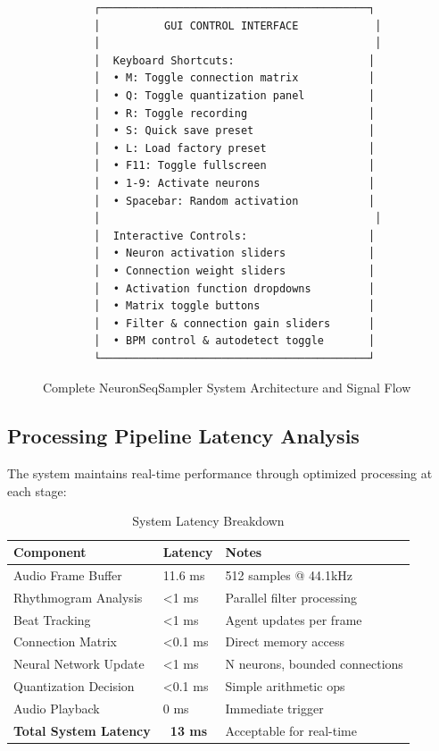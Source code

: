 \documentclass[11pt,a4paper]{article}
\begin{document}
\begin{figure}[h]
\begin{verbatim}
        ┌──────────────────────────────────────────┐
        │          GUI CONTROL INTERFACE            │
        │                                           │
        │  Keyboard Shortcuts:                     │
        │  • M: Toggle connection matrix           │
        │  • Q: Toggle quantization panel          │
        │  • R: Toggle recording                   │
        │  • S: Quick save preset                  │
        │  • L: Load factory preset                │
        │  • F11: Toggle fullscreen                │
        │  • 1-9: Activate neurons                 │
        │  • Spacebar: Random activation           │
        │                                           │
        │  Interactive Controls:                   │
        │  • Neuron activation sliders             │
        │  • Connection weight sliders             │
        │  • Activation function dropdowns         │
        │  • Matrix toggle buttons                 │
        │  • Filter & connection gain sliders      │
        │  • BPM control & autodetect toggle       │
        └──────────────────────────────────────────┘
\end{verbatim}
\caption{Complete NeuronSeqSampler System Architecture and Signal Flow}
\label{fig:system_architecture}
\end{figure}

\subsection{Processing Pipeline Latency Analysis}

The system maintains real-time performance through optimized processing at each stage:

\begin{table}[h]
\centering
\caption{System Latency Breakdown}
\begin{tabular}{@{}lll@{}}
\toprule
Component & Latency & Notes \\ \midrule
Audio Frame Buffer & 11.6 ms & 512 samples @ 44.1kHz \\
Rhythmogram Analysis & <1 ms & Parallel filter processing \\
Beat Tracking & <1 ms & Agent updates per frame \\
Connection Matrix & <0.1 ms & Direct memory access \\
Neural Network Update & <1 ms & N neurons, bounded connections \\
Quantization Decision & <0.1 ms & Simple arithmetic ops \\
Audio Playback & 0 ms & Immediate trigger \\
\midrule
\textbf{Total System Latency} & \textbf{~13 ms} & Acceptable for real-time \\
\bottomrule
\end{tabular}
\end{table}
\end{document}
